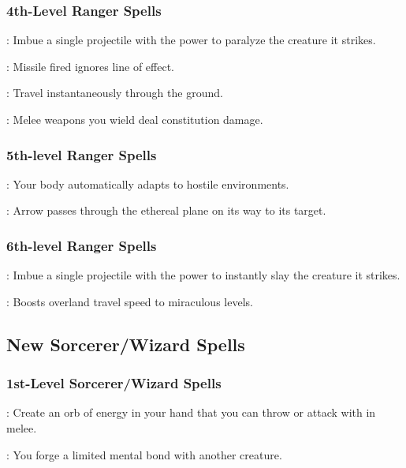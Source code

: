\subsubsection{4th-Level Ranger Spells}
\begin{list}{}{\leftmargin=1em}
 \item {}: Imbue a single projectile with the power to paralyze the creature it strikes.
 \item {}: Missile fired ignores line of effect.
 \item {}: Travel instantaneously through the ground.
 \item {}: Melee weapons you wield deal constitution damage.
\end{list}

\subsubsection{5th-level Ranger Spells}
\begin{list}{}{\leftmargin=1em}
 \item {}: Your body automatically adapts to hostile environments.
 \item {}: Arrow passes through the ethereal plane on its way to its target.
\end{list}

\subsubsection{6th-level Ranger Spells}
\begin{list}{}{\leftmargin=1em}
\item {}: Imbue a single projectile with the power to instantly slay the creature it strikes.
\item {}: Boosts overland travel speed to miraculous levels.
\end{list}

\subsection{New Sorcerer/Wizard Spells}
\subsubsection{1st-Level Sorcerer/Wizard Spells}
\begin{list}{}{\leftmargin=1em}
 \item {}: Create an orb of energy in your hand that you can throw or attack with in melee.
 \item {}: You forge a limited mental bond with another creature.
\end{list}

